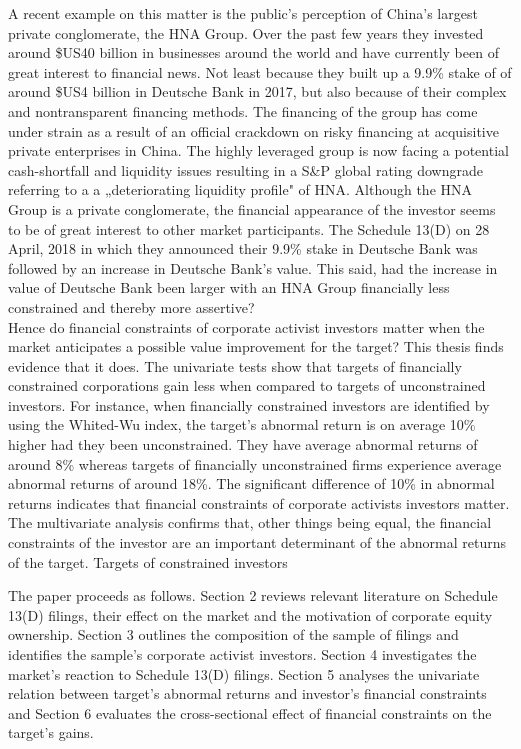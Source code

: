 \documentclass[12pt]{article}
\begin{document}
A recent example on this matter is the public's perception of China's largest private conglomerate, the HNA Group. Over the past few years they invested around \$US40 billion in businesses around the world and have currently been of great interest to financial news. Not least because they built up a 9.9\% stake of of around \$US4 billion in Deutsche Bank in 2017, but also because of their complex and nontransparent financing methods.
The financing of the group has come under strain as a result of an official crackdown on risky financing at acquisitive private enterprises in China. The highly leveraged group is now facing a potential cash-shortfall and liquidity issues resulting in a S\&P global rating downgrade referring to a a „deteriorating liquidity profile" of HNA. Although the HNA Group is a private conglomerate, the financial appearance of the investor seems to be of great interest to other market participants. The Schedule 13(D) on 28 April, 2018 in which they announced their 9.9\% stake in Deutsche Bank was followed by an increase in Deutsche Bank's value. This said, had the increase in value of Deutsche Bank been larger with an HNA Group financially less constrained and thereby more assertive?\\ 
Hence do financial constraints of corporate activist investors matter when the market anticipates a possible value improvement for the target? This thesis finds evidence that it does. The univariate tests show that targets of financially constrained corporations gain less when compared to targets of unconstrained investors. For instance, when financially constrained investors are identified by using the Whited-Wu index, the target's abnormal return is on average 10\% higher had they been unconstrained. They have average abnormal returns of around 8\% whereas targets of financially unconstrained firms experience average abnormal returns of around 18\%. The significant difference of 10\% in abnormal returns indicates that financial constraints of corporate activists investors matter. The multivariate analysis confirms that, other things being equal, the financial constraints of the investor are an important determinant of the abnormal returns of the target. Targets of constrained investors 

The paper proceeds as follows. Section 2 reviews relevant literature on Schedule 13(D) filings, their effect on the market and the motivation of corporate equity ownership. Section 3 outlines the composition of the sample of filings and identifies the sample's corporate activist investors. Section 4 investigates the market's reaction to Schedule 13(D) filings. Section 5 analyses the univariate relation between target's abnormal returns and investor's financial constraints and Section 6 evaluates the cross-sectional effect of financial constraints on the target's gains.
\end{document}
